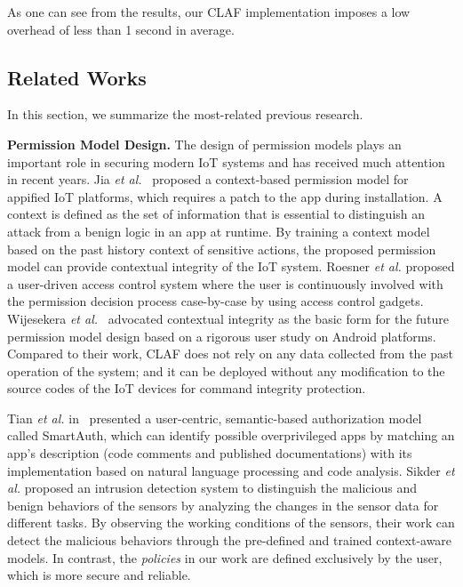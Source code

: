 \documentclass[letterpaper,12pt]{article}
\begin{document}
As one can see from the results, our CLAF implementation imposes a low overhead of less than 1 second in average. 

\subsection{Related Works}
\label{subsec:claf-related}
In this section, we summarize the most-related previous research.

\indent\textbf{Permission Model Design.} The design of permission models plays an important role in securing modern IoT systems and has received much attention in recent years. Jia \emph{et al.}~\cite{jia2017contexiot} proposed a context-based permission model for appified IoT platforms, which requires a patch to the app during installation. %
A context is defined as the set of information that is essential to distinguish an attack from a benign logic in an app at runtime. By training a context model based on the past history context of sensitive actions, the proposed permission model can provide contextual integrity of the IoT system. Roesner \emph{et al.} \cite{roesner2012user} proposed a user-driven access control system where the user is continuously involved with the permission decision process case-by-case by using access control gadgets. Wijesekera \emph{et al.}~\cite{wijesekera2015android} advocated contextual integrity as the basic form for the future permission model design based on a rigorous user study on Android platforms. Compared to their work, CLAF does not rely on any data collected from the past operation of the system; and it can be deployed without any modification to the source codes of the IoT devices for command integrity protection.

Tian \emph{et al.} in~\cite{tian2017smartauth} presented a user-centric, semantic-based authorization model called SmartAuth, which can identify possible overprivileged apps by matching an app's description (code comments and published documentations) with its implementation based on natural language processing and code analysis. Sikder \emph{et al.} \cite{sikder20176thsense} proposed an intrusion detection system to distinguish the malicious and benign behaviors of the sensors by analyzing the changes in the sensor data for different tasks. By observing the working conditions of the sensors, their work can detect the malicious behaviors through the pre-defined and trained context-aware models. In contrast, the \textit{policies} in our work are defined exclusively by the user, which is more secure and reliable.
\end{document}
